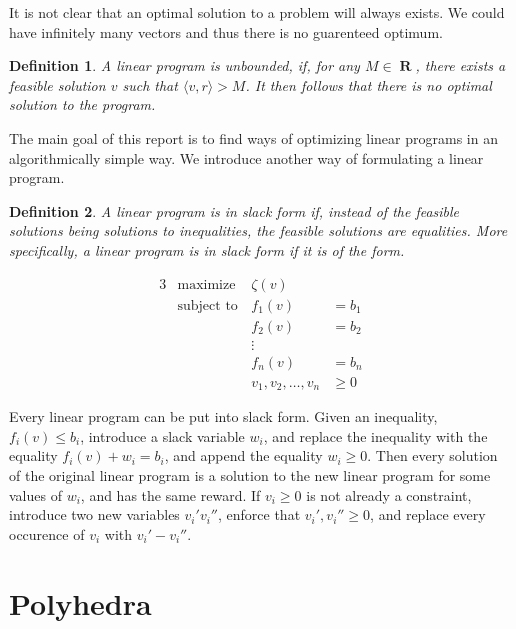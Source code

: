 \documentclass{report}
\DeclareMathOperator{\real}{\mathbf{R}}
\newtheorem{definition}{Definition}
\begin{document}
    It is not clear that an optimal solution to a problem will always exists. We could have infinitely many vectors and thus there is no guarenteed optimum.

    \begin{definition}
        A linear program is unbounded, if, for any $M \in \real$, there exists a feasible solution $v$ such that $\langle v,r \rangle > M$. It then follows that there is no optimal solution to the program.
    \end{definition}

    The main goal of this report is to find ways of optimizing linear programs in an algorithmically simple way. We introduce another way of formulating a linear program.

    \begin{definition}
        A linear program is in slack form if, instead of the feasible solutions being solutions to inequalities, the feasible solutions are equalities. More specifically, a linear program is in slack form if it is of the form.

        \begin{alignat*}{3}
        &\text{maximize }  & \zeta(v) &\\
        &\text{subject to} & f_1(v) &= b_1\\
        &                  & f_2(v) &= b_2\\
        &                  & \vdots &\\
        &                  & f_n(v) &= b_n\\
        &                  & v_1,v_2,\dots,v_n &\geq 0
        \end{alignat*}
    \end{definition}

    Every linear program can be put into slack form. Given an inequality, $f_i(v) \leq b_i$, introduce a slack variable $w_i$, and replace the inequality with the equality $f_i(v) + w_i = b_i$, and append the equality $w_i \geq 0$. Then every solution of the original linear program is a solution to the new linear program for some values of $w_i$, and has the same reward. If $v_i \geq 0$ is not already a constraint, introduce two new variables $v_i' v_i''$, enforce that $v_i',v_i'' \geq 0$, and replace every occurence of $v_i$ with $v_i' - v_i''$.









    \chapter{Polyhedra}
\end{document}
